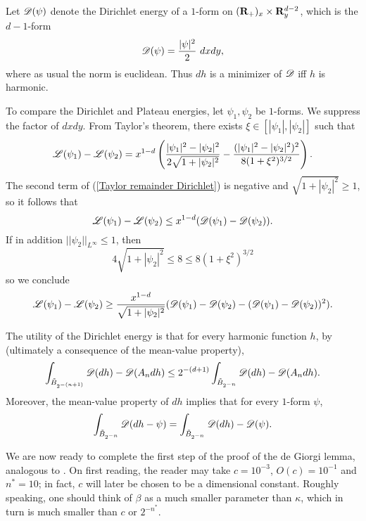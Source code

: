 \begin{notation}
Let $\mathscr D(\psi)$ denote the Dirichlet energy of a $1$-form on $(\mathbf{R}_+)_x \times \mathbf{R}^{d - 2}_y$, which is the $d-1$-form
$$\mathscr D(\psi) = \frac{|\psi|^2}{2} ~dxdy,$$
where as usual the norm is euclidean.
Thus $dh$ is a minimizer of $\mathscr D$ iff $h$ is harmonic.
\end{notation}

To compare the Dirichlet and Plateau energies, let $\psi_1, \psi_2$ be $1$-forms.
We suppress the factor of $dxdy$.
From Taylor's theorem, there exists $\xi \in [|\psi_1|, |\psi_2|]$ such that
\begin{equation}\label{Taylor remainder Dirichlet}
\mathscr L(\psi_1) - \mathscr L(\psi_2) = x^{1 - d}\left(\frac{|\psi_1|^2 - |\psi_2|^2}{2\sqrt{1 + |\psi_2|^2}} - \frac{(|\psi_1|^2 - |\psi_2|^2)^2}{8(1 + \xi^2)^{3/2}}\right).
\end{equation}
The second term of (\ref{Taylor remainder Dirichlet}) is negative and $\sqrt{1 + |\psi_2|^2} \geq 1$, so it follows that
\begin{equation}\label{Taylor lower bound}
\mathscr L(\psi_1) - \mathscr L(\psi_2) \leq x^{1 - d} (\mathscr D(\psi_1) - \mathscr D(\psi_2)).
\end{equation}
If in addition $||\psi_2||_{L^\infty} \leq 1$, then
$$4\sqrt{1 + |\psi_2|^2} \leq 8 \leq 8(1 + \xi^2)^{3/2}$$
so we conclude
\begin{equation}\label{Taylor upper bound}
\mathscr L(\psi_1) - \mathscr L(\psi_2) \geq \frac{x^{1 - d}}{\sqrt{1 + |\psi_2|^2}} (\mathscr D(\psi_1) - \mathscr D(\psi_2) - (\mathscr D(\psi_1) - \mathscr D(\psi_2))^2).
\end{equation}

The utility of the Dirichlet energy is that for every harmonic function $h$, by \cite[Lemma 4.1]{Miranda66} (ultimately a consequence of the mean-value property),
\begin{equation}\label{Miranda41}
\int_{\tilde B_{2^{-(n+1)}}} \mathscr D(dh) - \mathscr D(A_n dh) \leq 2^{-(d + 1)} \int_{\tilde B_{2^{-n}}} \mathscr D(dh) - \mathscr D(A_n dh).
\end{equation}
Moreover, the mean-value property of $dh$ implies that for every $1$-form $\psi$,
\begin{equation}\label{MVP derivative}
\int_{\tilde B_{2^{-n}}} \mathscr D(dh - \psi) = \int_{\tilde B_{2^{-n}}} \mathscr D(dh) - \mathscr D(\psi).
\end{equation}

We are now ready to complete the first step of the proof of the de Giorgi lemma, analogous to \cite[Teorema 4.3]{Miranda66}.
On first reading, the reader may take $c = 10^{-3}$, $O(c) = 10^{-1}$ and $n^* = 10$; in fact, $c$ will later be chosen to be a dimensional constant.
Roughly speaking, one should think of $\beta$ as a much smaller parameter than $\kappa$, which in turn is much smaller than $c$ or $2^{-n^*}$.

